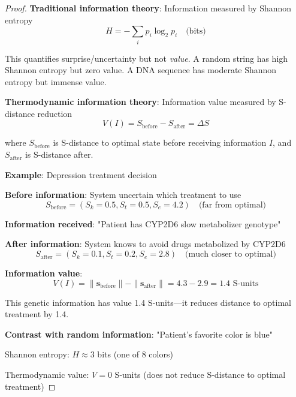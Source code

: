 \begin{proof}
\textbf{Traditional information theory}: Information measured by Shannon entropy
\begin{equation}
H = -\sum_i p_i \log_2 p_i \quad \text{(bits)}
\end{equation}

This quantifies surprise/uncertainty but not \textit{value}. A random string has high Shannon entropy but zero value. A DNA sequence has moderate Shannon entropy but immense value.

\textbf{Thermodynamic information theory}: Information value measured by S-distance reduction
\begin{equation}
V(I) = S_{\text{before}} - S_{\text{after}} = \Delta S
\end{equation}

where $S_{\text{before}}$ is S-distance to optimal state before receiving information $I$, and $S_{\text{after}}$ is S-distance after.

\textbf{Example}: Depression treatment decision

\textbf{Before information}: System uncertain which treatment to use
\begin{equation}
S_{\text{before}} = (S_k=0.5, S_t=0.5, S_e=4.2) \quad \text{(far from optimal)}
\end{equation}

\textbf{Information received}: "Patient has CYP2D6 slow metabolizer genotype"

\textbf{After information}: System knows to avoid drugs metabolized by CYP2D6
\begin{equation}
S_{\text{after}} = (S_k=0.1, S_t=0.2, S_e=2.8) \quad \text{(much closer to optimal)}
\end{equation}

\textbf{Information value}:
\begin{equation}
V(I) = \|\mathbf{s}_{\text{before}}\| - \|\mathbf{s}_{\text{after}}\| = 4.3 - 2.9 = 1.4 \text{ S-units}
\end{equation}

This genetic information has value 1.4 S-units—it reduces distance to optimal treatment by 1.4.

\textbf{Contrast with random information}: "Patient's favorite color is blue"

Shannon entropy: $H \approx 3$ bits (one of 8 colors)

Thermodynamic value: $V = 0$ S-units (does not reduce S-distance to optimal treatment)


\end{proof}
